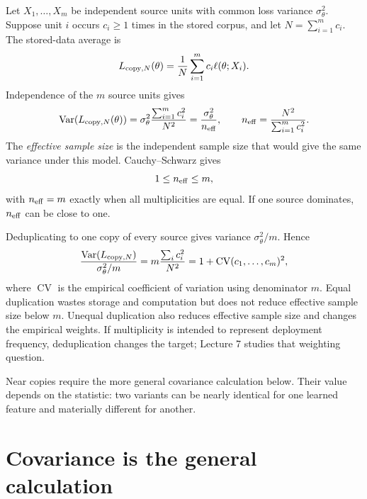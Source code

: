 \documentclass[11pt,twoside]{article}
\theoremstyle{definition}
\theoremstyle{remark}
\begin{document}
Let \(X_1,\ldots,X_m\) be independent source units with common loss variance
\(\sigma_\theta^2\). Suppose unit \(i\) occurs \(c_i\geq1\) times in the
stored corpus, and let \(N=\sum_{i=1}^m c_i\). The stored-data average is
\begin{equation}
 L_{{\rm copy},N}(\theta)
 =\frac1N\sum_{i=1}^m c_i\ell(\theta;X_i).
 \label{eq:copy-average}
\end{equation}
Independence of the \(m\) source units gives
\begin{equation}
 \operatorname{Var}(L_{{\rm copy},N}(\theta))
 =\sigma_\theta^2\frac{\sum_{i=1}^m c_i^2}{N^2}
 =\frac{\sigma_\theta^2}{n_{\rm eff}},
 \qquad
 n_{\rm eff}=\frac{N^2}{\sum_{i=1}^m c_i^2}.
 \label{eq:copy-neff}
\end{equation}
The \emph{effective sample size} is the independent sample size that would
give the same variance under this model. Cauchy--Schwarz gives
\begin{equation}
 1\leq n_{\rm eff}\leq m,
 \label{eq:neff-bounds}
\end{equation}
with \(n_{\rm eff}=m\) exactly when all multiplicities are equal. If one
source dominates, \(n_{\rm eff}\) can be close to one.

Deduplicating to one copy of every source gives variance
\(\sigma_\theta^2/m\). Hence
\[
 \frac{\operatorname{Var}(L_{{\rm copy},N})}
      {\sigma_\theta^2/m}
 =m\frac{\sum_i c_i^2}{N^2}
 =1+\operatorname{CV}(c_1,\ldots,c_m)^2,
\]
where \(\operatorname{CV}\) is the empirical coefficient of variation using
denominator \(m\). Equal duplication wastes storage and computation but does
not reduce effective sample size below \(m\). Unequal duplication also reduces
effective sample size and changes the empirical weights. If multiplicity is
intended to represent deployment frequency, deduplication changes the target;
Lecture 7 studies that weighting question.

Near copies require the more general covariance calculation below. Their value
depends on the statistic: two variants can be nearly identical for one learned
feature and materially different for another.

\section{Covariance is the general calculation}
\label{sec:covariance}
\end{document}
